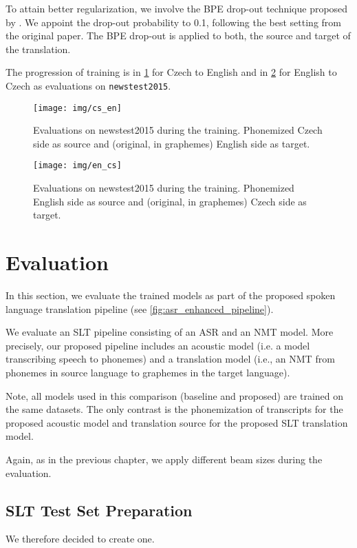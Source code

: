 To attain better regularization, we involve the BPE drop-out technique proposed by . We appoint the drop-out probability to 0.1, following the best setting from the original paper. The BPE drop-out is applied to both, the source and target of the translation.

The progression of training is in \cref{fig:cs_en} for Czech to English and in \cref{fig:en_cs} for English to Czech as evaluations on \texttt{newstest2015}.

\begin{figure}[h]
	\texttt{[image: img/cs\_en]}
	\caption{Evaluations on newstest2015 during the training. Phonemized Czech side as source and (original, in graphemes) English side as target.}
	\label{fig:cs_en}
\end{figure}

\begin{figure}[h]
	\texttt{[image: img/en\_cs]}
	\caption{Evaluations on newstest2015 during the training. Phonemized English side as source and (original, in graphemes) Czech side as target.}
	\label{fig:en_cs}
\end{figure}

\section{Evaluation}
\label{slt:evaluation}
In this section, we evaluate the trained models as part of the proposed spoken language translation pipeline (see \cref{fig:asr_enhanced_pipeline}).

We evaluate an SLT pipeline consisting of an ASR and an NMT model. More precisely, our proposed pipeline includes an acoustic model (i.e. a model transcribing speech to phonemes) and a translation model (i.e., an NMT from phonemes in source language to graphemes in the target language). 

Note, all models used in this comparison (baseline and proposed) are trained on the same datasets. The only contrast is the phonemization of transcripts for the proposed acoustic model and translation source for the proposed SLT translation model.

Again, as in the previous chapter, we apply different beam sizes during the evaluation.

\subsection{SLT Test Set Preparation}
\label{read-newstest}
 We therefore decided to create one.

